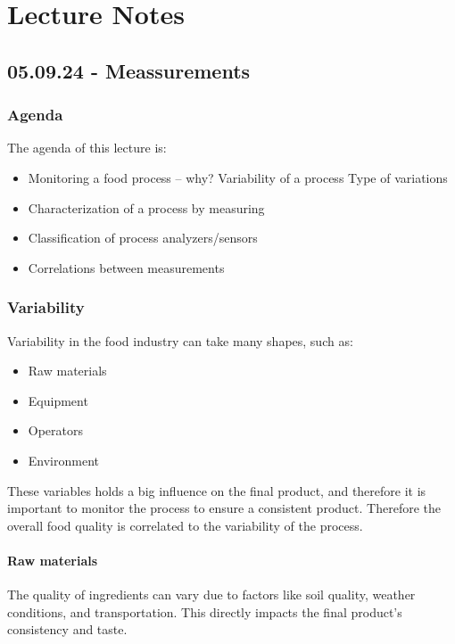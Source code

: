 \chapter{Lecture Notes}

\section{05.09.24 - Meassurements}

\subsection{Agenda}
The agenda of this lecture is:
\begin{highlight}
    \begin{itemize}
        \item Monitoring a food process – why?
        \subitem * Variability of a process
        \subitem * Type of variations
        \item Characterization of a process by measuring
        \item Classification of process analyzers/sensors
        \item Correlations between measurements
    \end{itemize}
\end{highlight}

\subsection{Variability}
Variability in the food industry can take many shapes, such as:
\begin{highlight}
    \begin{itemize}
        \item Raw materials
        \item Equipment
        \item Operators
        \item Environment
    \end{itemize}
\end{highlight}

These variables holds a big influence on the final product, and therefore it is important to monitor the process to ensure a consistent product. Therefore the overall food quality is correlated to the variability of the process.

\subsubsection*{Raw materials}
The quality of ingredients can vary due to factors like soil quality, weather conditions, and transportation. This directly impacts the final product's consistency and taste.

